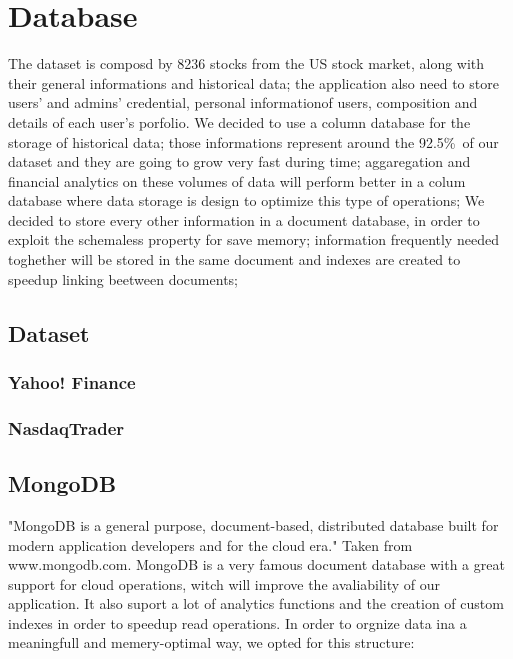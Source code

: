 \chapter{Database}

The dataset is composd by 8236 stocks from the US stock market, along with
their general informations and historical data; the application also need to store 
users' and admins' credential, personal informationof users, composition and details of
each user's porfolio.
We decided to use a column database for the storage of historical data; those 
informations represent around the 92.5\%\ of our dataset and they are going to grow very fast
during time; aggaregation and financial analytics on these volumes of data will perform
better in a colum database where data storage is design to optimize this type of operations;
We decided to store every other information in a document database, in order to exploit the
schemaless property for save memory; information frequently needed toghether will be stored 
in the same document and indexes are created to speedup linking beetween documents; 


\section{Dataset}


\subsection{Yahoo! Finance}

\subsection{NasdaqTrader}

\section{MongoDB}
"MongoDB is a general purpose, document-based, distributed database built 
for modern application developers and for the cloud era." Taken from www.mongodb.com.
MongoDB is a very famous document database with a great support for cloud operations, witch 
will improve the avaliability of our application. It also suport a lot of analytics functions
and the creation of custom indexes in order to speedup read operations.
In order to orgnize data ina a meaningfull and memery-optimal way, we opted for this structure:

